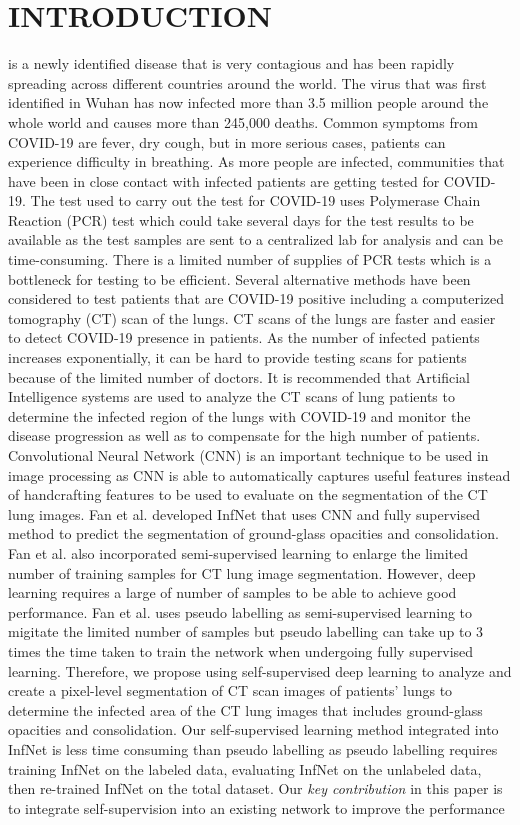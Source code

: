 \section{INTRODUCTION}

 is a newly identified disease that is very contagious and has been rapidly spreading across different countries around the world. The virus that was first identified in Wuhan has now infected more than 3.5 million people around the whole world and causes more than 245,000 deaths. Common symptoms from COVID-19 are fever, dry cough, but in more serious cases, patients can experience difficulty in breathing. As more people are infected, communities that have been in close contact with infected patients are getting tested for COVID-19. The test used to carry out the test for COVID-19 uses Polymerase Chain Reaction (PCR) test which could take several days for the test results to be available as the test samples are sent to a centralized lab for analysis and can be time-consuming. There is a limited number of supplies of PCR tests which is a bottleneck for testing to be efficient. Several alternative methods have been considered to test patients that are COVID-19 positive including a computerized tomography (CT) scan of the lungs. CT scans of the lungs are faster and easier to detect COVID-19 presence in patients. As the number of infected patients increases exponentially, it can be hard to provide testing scans for patients because of the limited number of doctors. It is recommended that Artificial Intelligence systems are used to analyze the CT scans of lung patients to determine the infected region of the lungs with COVID-19 and monitor the disease progression as well as to compensate for the high number of patients. Convolutional Neural Network (CNN) \cite{ref1} is an important technique to be used in image processing as CNN is able to automatically captures useful features instead of handcrafting features to be used to evaluate on the segmentation of the CT lung images. Fan et al. \cite{ref2} developed InfNet that uses CNN and fully supervised method to predict the segmentation of ground-glass opacities and consolidation. Fan et al. also incorporated semi-supervised learning to enlarge the limited number of training samples for CT lung image segmentation. However, deep learning requires a large of number of samples to be able to achieve good performance. Fan et al. uses pseudo labelling as semi-supervised learning to migitate the limited number of samples but pseudo labelling can take up to 3 times the time taken to train the network when undergoing fully supervised learning.  Therefore, we propose using self-supervised deep learning to analyze and create a pixel-level segmentation of CT scan images of patients’ lungs to determine the infected area of the CT lung images that includes ground-glass opacities and consolidation. Our self-supervised learning method integrated into InfNet is less time consuming than pseudo labelling as pseudo labelling requires training InfNet on the labeled data, evaluating InfNet on the unlabeled data, then re-trained InfNet on the total dataset. Our \textit{key contribution} in this paper is to integrate self-supervision into an existing network to improve the performance 